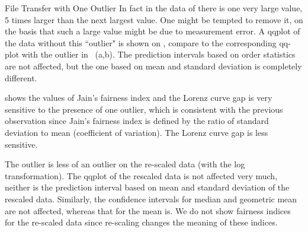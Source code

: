 \begin{ex}{File Transfer with One Outlier}
In fact in the data of  there is one very
large value, 5 times larger than the next largest value. One
might be tempted to remove it, on the basis that such a large
value might be due to measurement error. A qqplot of the data
without this ``outlier" is shown on ,
compare to the corresponding qq-plot with the outlier in
~(a,b). The prediction intervals based on
order statistics are not affected, but the one based on mean
and standard deviation is completely different.

 shows the values of Jain's fairness index and
the Lorenz curve gap is very sensitive to the presence of one
outlier, which is consistent with the previous observation
since Jain's fairness index is defined by the ratio of standard
deviation to mean (coefficient of variation). The Lorenz curve
gap is less sensitive.

The outlier is less of an outlier on the re-scaled data (with
the log transformation). The qqplot of the rescaled data is not
affected very much, neither is the prediction interval based on
mean and standard deviation of the rescaled data. Similarly,
the confidence intervals for median and geometric mean are not
affected, whereas that for the mean is. We do not show fairness
indices for the re-scaled data since re-scaling changes the
meaning of these indices.
\end{ex}

